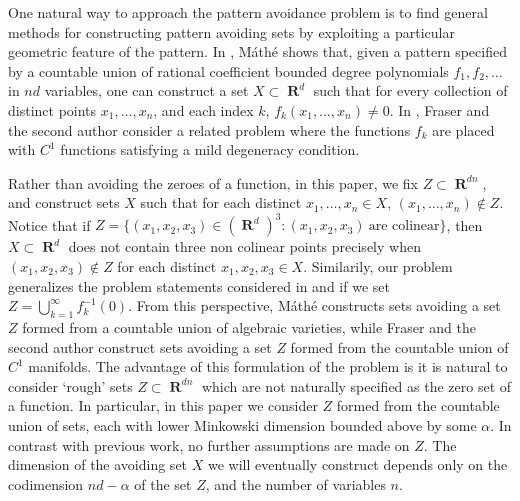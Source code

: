 \documentclass[dvipsnames,letterpaper,12pt]{article}
\numberwithin{equation}{section}
\theoremstyle{plain}
\DeclareMathOperator{\RR}{\mathbf{R}}
\begin{document}
One natural way to approach the pattern avoidance problem is to find general methods for constructing pattern avoiding sets by exploiting a particular geometric feature of the pattern. In \cite{Mathe}, M\'{a}th\'{e} shows that, given a pattern specified by a countable union of rational coefficient bounded degree polynomials $f_1, f_2, \dots$ in $nd$ variables, one can construct a set $X \subset \RR^d$ such that for every collection of distinct points $x_1, \dots, x_n$, and each index $k$, $f_k(x_1, \dots, x_n) \neq 0$. In \cite{MalabikaRob}, Fraser and the second author consider a related problem where the functions $f_k$ are placed with $C^1$ functions satisfying a mild degeneracy condition.



Rather than avoiding the zeroes of a function, in this paper, we fix $Z \subset \RR^{dn}$, and construct sets $X$ such that for each distinct $x_1, \dots, x_n \in X$, $(x_1, \dots, x_n) \not \in Z$. Notice that if $Z = \{ (x_1,x_2,x_3) \in (\RR^d)^3 : (x_1,x_2,x_3)\ \text{are colinear} \}$, then $X \subset \RR^d$ does not contain three non colinear points precisely when $(x_1,x_2,x_3) \not \in Z$ for each distinct $x_1,x_2,x_3 \in X$. Similarily, our problem generalizes the problem statements considered in \cite{Mathe} and \cite{MalabikaRob} if we set $Z = \bigcup_{k = 1}^\infty f_k^{-1}(0)$. From this perspective, M\'{a}th\'{e} constructs sets avoiding a set $Z$ formed from a countable union of algebraic varieties, while Fraser and the second author construct sets avoiding a set $Z$ formed from the countable union of $C^1$ manifolds. The advantage of this formulation of the problem is it is natural to consider `rough' sets $Z \subset \RR^{dn}$ which are not naturally specified as the zero set of a function. In particular, in this paper we consider $Z$ formed from the countable union of sets, each with lower Minkowski dimension bounded above by some $\alpha$. In contrast with previous work, no further assumptions are made on $Z$. The dimension of the avoiding set $X$ we will eventually construct depends only on the codimension $nd - \alpha$ of the set $Z$, and the number of variables $n$.
\end{document}
